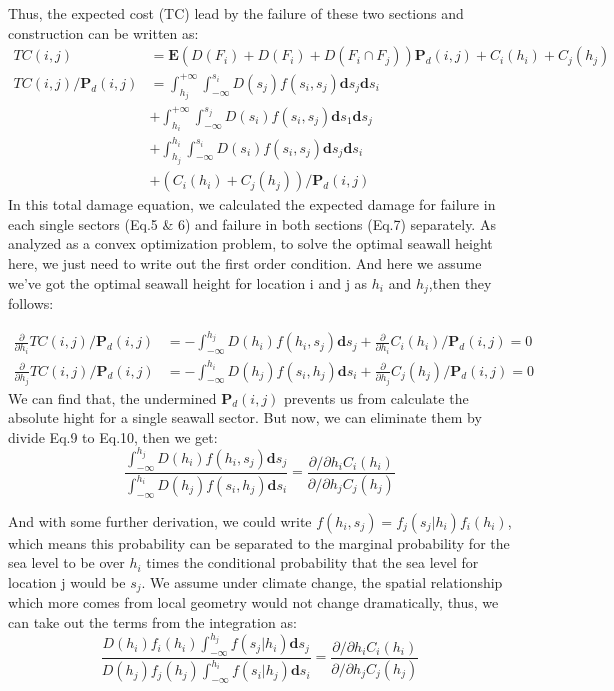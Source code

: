 \documentclass{article}
\begin{document}
Thus, the expected cost (TC) lead by the failure of these two sections and construction can be written as:
\begin{align}
    TC(i,j) &= \mathbf{E} (D(F_i)+D(F_i)+D(F_i\cap F_j))\mathbf{P}_d(i,j)+C_i(h_i)+C_j(h_j)\\
    TC(i,j)/\mathbf{P}_d(i,j)&= \int_{h_j}^{+\infty}\int_{-\infty}^{s_i} D(s_j)f(s_i,s_j)\mathbf{d}s_j\mathbf{d}s_i\\
    &+\int_{h_i}^{+\infty}\int_{-\infty}^{s_j} D(s_i)f(s_i,s_j)\mathbf{d}s_1\mathbf{d}s_j\\
    &+\int_{h_j}^{h_i}\int_{-\infty}^{s_i} D(s_i)f(s_i,s_j)\mathbf{d}s_j\mathbf{d}s_i\\
    &+ (C_i(h_i)+C_j(h_j))/\mathbf{P}_d(i,j)
\end{align}
In this total damage equation, we calculated the expected damage for failure in each single sectors (Eq.5 \& 6) and failure in both sections (Eq.7) separately. As analyzed as a convex optimization problem, to solve the optimal seawall height here, we just need to write out the first order condition. And here we assume we've got the optimal seawall height for location i and j as $h_i$ and $h_j$,then they follows:

\begin{align}
    \frac{\partial }{\partial h_i } TC(i,j)/\mathbf{P}_d(i,j)&= -\int_{-\infty}^{h_j} D(h_i)f(h_i,s_j)\mathbf{d}s_j+ \frac{\partial}{\partial h_i}C_i(h_i)/\mathbf{P}_d(i,j)=0\\
    \frac{\partial }{\partial h_j } TC(i,j)/\mathbf{P}_d(i,j)&= -\int_{-\infty}^{h_i} D(h_j)f(s_i,h_j)\mathbf{d}s_i+ \frac{\partial}{\partial h_j}C_j(h_j)/\mathbf{P}_d(i,j)=0
\end{align}
We can find that, the undermined $\mathbf{P}_d(i,j)$ prevents us from calculate the absolute hight for a single seawall sector. But now, we can eliminate them by divide Eq.9 to Eq.10, then we get:
\begin{equation}
    \frac{\int_{-\infty}^{h_j} D(h_i)f(h_i,s_j)\mathbf{d}s_j}{\int_{-\infty}^{h_i} D(h_j)f(s_i,h_j)\mathbf{d}s_i} = \frac{{\partial}/{\partial h_i}C_i(h_i)}{{\partial}/{\partial h_j}C_j(h_j)}
\end{equation}

And with some further derivation, we could write $f(h_i,s_j) = f_j(s_j|h_i)f_i(h_i)$, which means this probability can be separated to the marginal probability for the sea level to be over $h_i$ times the conditional probability that the sea level for location j would be $s_j$. We assume under climate change,  the spatial relationship which more comes from local geometry would not change dramatically, thus, we can take out the terms from the integration as:
\begin{equation}
    \frac{D(h_i)f_i(h_i)\int_{-\infty}^{h_j} f(s_j|h_i)\mathbf{d}s_j}{D(h_j)f_j(h_j)\int_{-\infty}^{h_i} f(s_i|h_j)\mathbf{d}s_i} = \frac{{\partial}/{\partial h_i}C_i(h_i)}{{\partial}/{\partial h_j}C_j(h_j)}
\end{equation}
\end{document}

